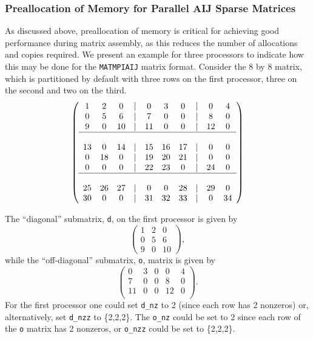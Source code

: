 \subsubsection{Preallocation of Memory for Parallel AIJ Sparse Matrices}

As discussed above, preallocation of memory is critical for achieving good
performance during matrix assembly, as this reduces the number of
allocations and copies required.  We present an example for
three processors to indicate how this may be done for the {\tt MATMPIAIJ}
matrix format.  Consider the 8 by
8 matrix, which is partitioned by default with three rows on the first
processor, three on the second and two on the third.  {\small
\[
\left( \begin{array}{cccccccccc} 
1  & 2  & 0  & | & 0  & 3  & 0  & |  & 0  & 4  \\
0  & 5  & 6  & | & 7  & 0  & 0  & |  & 8  & 0 \\
9  & 0  & 10 & | & 11 & 0  & 0  & |  & 12 & 0  \\
\hline \\
13 & 0  & 14 & | & 15 & 16 & 17 & |  & 0  & 0  \\
0  & 18 & 0  & | & 19 & 20 & 21 & |  & 0  & 0 \\
0  & 0  & 0  & | & 22 & 23 & 0  & |  & 24 & 0 \\
\hline \\
25 & 26 & 27 & | & 0  & 0  & 28 & |  & 29 & 0 \\
30 & 0  & 0  & | & 31 & 32 & 33 & |  & 0  &34 
\end{array} \right)
\]
}

The ``diagonal'' submatrix, {\tt d}, on the first processor is given by 
{\small
\[
\left( \begin{array}{ccc} 
1  & 2  & 0  \\
0  & 5  & 6  \\
9  & 0  & 10 
\end{array} \right),
\]
}
while the ``off-diagonal'' submatrix, {\tt o}, matrix is given by 
{\small
\[
\left( \begin{array}{ccccc} 
 0  & 3  & 0   & 0  & 4  \\
 7  & 0  & 0   & 8  & 0  \\
 11 & 0  & 0   & 12 & 0  \\
\end{array} \right).
\]
}
For the first processor one could set {\tt d\_nz} to 2 (since each
row has 2 nonzeros) or, alternatively, set {\tt d\_nzz} to \{2,2,2\}.
The {\tt o\_nz} could be set to 2 since each row of the {\tt o} matrix
has 2 nonzeros, or {\tt o\_nzz} could be set to \{2,2,2\}.

